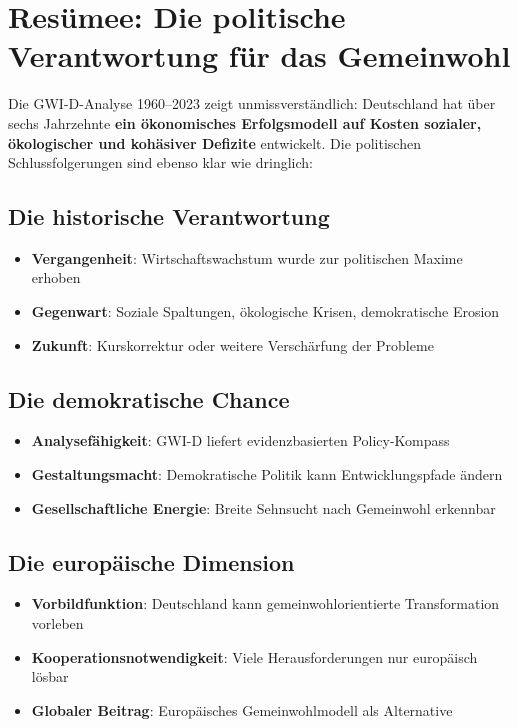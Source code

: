 \section{Resümee: Die politische Verantwortung für das Gemeinwohl}

Die GWI-D-Analyse 1960–2023 zeigt unmissverständlich: Deutschland hat über sechs Jahrzehnte \textbf{ein ökonomisches Erfolgsmodell auf Kosten sozialer, ökologischer und kohäsiver Defizite} entwickelt. Die politischen Schlussfolgerungen sind ebenso klar wie dringlich:

\subsection{Die historische Verantwortung}

\begin{itemize}
    \item \textbf{Vergangenheit}: Wirtschaftswachstum wurde zur politischen Maxime erhoben
    \item \textbf{Gegenwart}: Soziale Spaltungen, ökologische Krisen, demokratische Erosion
    \item \textbf{Zukunft}: Kurskorrektur oder weitere Verschärfung der Probleme
\end{itemize}

\subsection{Die demokratische Chance}

\begin{itemize}
    \item \textbf{Analysefähigkeit}: GWI-D liefert evidenzbasierten Policy-Kompass
    \item \textbf{Gestaltungsmacht}: Demokratische Politik kann Entwicklungspfade ändern
    \item \textbf{Gesellschaftliche Energie}: Breite Sehnsucht nach Gemeinwohl erkennbar
\end{itemize}

\subsection{Die europäische Dimension}

\begin{itemize}
    \item \textbf{Vorbildfunktion}: Deutschland kann gemeinwohlorientierte Transformation vorleben
    \item \textbf{Kooperationsnotwendigkeit}: Viele Herausforderungen nur europäisch lösbar
    \item \textbf{Globaler Beitrag}: Europäisches Gemeinwohlmodell als Alternative
\end{itemize}

